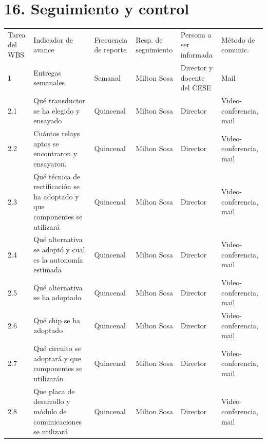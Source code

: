 \documentclass[11pt]{charter}
\begin{document}
\section{16. Seguimiento y control}
\label{sec:seguimiento}
\begin{table}[H]
\centering
\begin{tabularx}{\linewidth}{@{}|X|X|X|X|X|X|@{}}
\hline
\rowcolor[HTML]{C0C0C0} 
\multicolumn{6}{|c|}{\cellcolor[HTML]{C0C0C0}SEGUIMIENTO DE AVANCE}                                                                       \\ \hline
\rowcolor[HTML]{C0C0C0} 
Tarea del WBS & Indicador de avance & Frecuencia de reporte & Resp. de seguimiento & Persona a ser informada & Método de comunic. \\ \hline
 1&Entregas semanales& Semanal&Milton Sosa& Director y docente del CESE&Mail\\ \hline
 2.1&Qué transductor se ha elegido y ensayado&Quincenal&Milton Sosa&Director&Video-conferencia, mail\\ \hline
 2.2&Cuántos relays aptos se encontraron y ensayaron.&Quincenal&Milton Sosa&Director&Video-conferencia, mail\\ \hline
 2.3&Qué técnica de rectificación se ha adoptado y que componentes se utilizará&Quincenal&Milton Sosa&Director& Video-conferencia, mail\\ \hline
 2.4&Qué alternativa se adoptó y cual es la autonomía estimada&Quincenal&Milton Sosa&Director&Video-conferencia, mail\\ \hline
 2.5&Qué alternativa se ha adoptado&Quincenal&Milton Sosa&Director&Video-conferencia, mail\\ \hline
 2.6&Qué chip se ha adoptado&Quincenal&Milton Sosa&Director&Video-conferencia, mail\\ \hline
 2.7&Qué circuito se adoptará y que componentes se utilizarán&Quincenal&Milton Sosa&Director&Video-conferencia, mail\\ \hline
 2.8&Que placa de desarrollo y módulo de comunicaciones se utilizará&Quincenal&Milton Sosa&Director&Video-conferencia, mail\\ \hline
\end{tabularx}%
\end{table}
\end{document}
